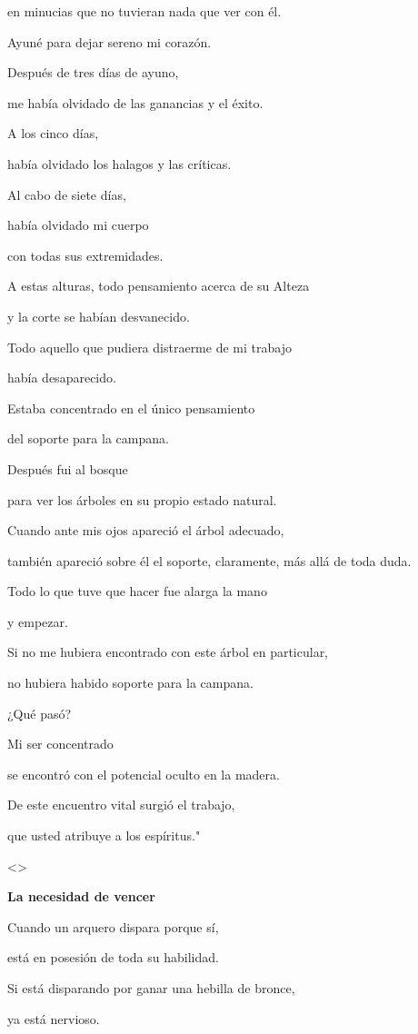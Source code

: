 en minucias que no tuvieran nada que ver con él.

Ayuné para dejar sereno mi corazón.

Después de tres días de ayuno,

me había olvidado de las ganancias y el éxito.

A los cinco días,

había olvidado los halagos y las críticas.

Al cabo de siete días,

había olvidado mi cuerpo

con todas sus extremidades.

A estas alturas, todo pensamiento acerca de su Alteza

y la corte se habían desvanecido.

Todo aquello que pudiera distraerme de mi trabajo

había desaparecido.

Estaba concentrado en el único pensamiento

del soporte para la campana.

Después fui al bosque

para ver los árboles en su propio estado natural.

Cuando ante mis ojos apareció el árbol adecuado,

también apareció sobre él el soporte, claramente, más allá de toda duda.

Todo lo que tuve que hacer fue alarga la mano

y empezar.

Si no me hubiera encontrado con este árbol en particular,

no hubiera habido soporte para la campana.

¿Qué pasó?

Mi ser concentrado

se encontró con el potencial oculto en la madera.

De este encuentro vital surgió el trabajo,

que usted atribuye a los espíritus."

\textless\textgreater{}

\textbf{{La necesidad de vencer}}

Cuando un arquero dispara porque sí,

está en posesión de toda su habilidad.

Si está disparando por ganar una hebilla de bronce,

ya está nervioso.

